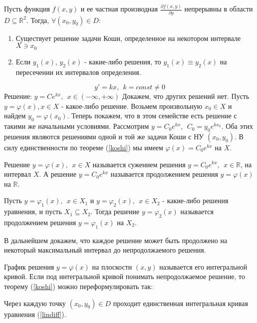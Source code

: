   \begin{teo}
  \label{koshi}
  Пусть функция $f(x, y)$ и ее частная производная $\frac{\partial f(x,y)}{\partial y}$ непрерывны в области $D\subseteq \mathbb{R}^2$. Тогда, $\forall (x_0, y_0) \in D$:
  \begin{enumerate}
  \item Существует решение задачи Коши, определенное на некотором интервале $ X \ni x_0 $
  \item Если $y_1(x)$, $y_2(x)$ - какие-либо решения, то $y_1(x) \equiv y_2(x)$ на пересечении их интервалов определения.
  \end{enumerate}
  \end{teo}
  
  \begin{xmp}
  $$ y' = kx ,~~ k = const \neq 0 $$
  Решение: $y = Ce^{kx}, ~~ x \in (-\infty, +\infty)$
  Докажем, что других решений нет. Пусть $y = \varphi(x), x \in X$ - какое-либо решение. Возьмем произвольную $x_0 \in X$ и найдем $y_0 = \varphi(x_0)$. Теперь покажем, что в этом семействе есть решение с такими же начальными условиями. Рассмотрим $ y = C_0 e^{kx},~~ C_0 = y_0e^{kx_0} $.  Оба этих решения являются решениями одной и той же задачи Коши с НУ $(x_0, y_0)$. В силу единственности по теореме (\ref{koshi}) мы имеем $\varphi(x)  = C_0 e^{kx}$ на $X$.
  \end{xmp}
  \begin{ntc}
  Решение $y = \varphi (x),~~ x \in X$ называется сужением решения $y = C_0e^{kx},~~ x \in \mathbb{R}$, на интервал $X$. А решение $y = C_0e^{kx}$ называется продолжением решения $y = \varphi (x)$ на $\mathbb{R} $.
  \end{ntc}
  
  \begin{df}
  Пусть $ y = \varphi_1(x),~~ x \in X_1 $ и $ y = \varphi_2(x),~~ x \in X_2 $ - какие-либо решения уравнения, и пусть $ X_1 \subseteq X_2 $. Тогда решение $ y = \varphi_2(x) $ называется продолжением решения $ y = \varphi_1(x) $ на $X_2$.
  \end{df} 
  \begin{ntc}
  В дальнейшем докажем, что каждое решение может быть продолжено на некоторый максимальный интервал до непродолжаемого решения.
  \end{ntc}
  
  \begin{df}
  График решения $ y = \varphi(x) $ на плоскости $(x, y)$  называется его интегральной кривой. Если под интегральной кривой понимать непродолжаемое решение, то теорему (\ref{koshi}) можно переформулировать так:
  
  Через каждую точку $(x_0, y_0) \in D$ проходит единственная интегральная кривая уравнения (\ref{lindiff}). 
  \end{df}
  
